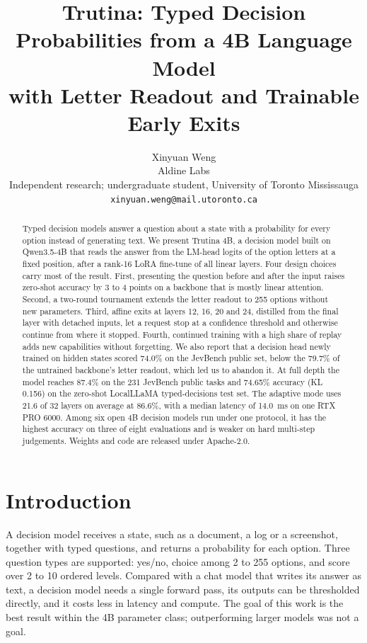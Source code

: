 \documentclass[10pt]{article}
\title{Trutina: Typed Decision Probabilities from a 4B Language Model\\with Letter Readout and Trainable Early Exits}
\author{Xinyuan Weng\\[2pt]\small Aldine Labs\\\small Independent research; undergraduate student, University of Toronto Mississauga\\\small \texttt{xinyuan.weng@mail.utoronto.ca}}
\date{}
\begin{document}
\maketitle

\begin{abstract}
Typed decision models answer a question about a state with a probability for every option instead of generating text.
We present Trutina 4B, a decision model built on Qwen3.5-4B that reads the answer from the LM-head logits of the option letters at a fixed position, after a rank-16 LoRA fine-tune of all linear layers.
Four design choices carry most of the result.
First, presenting the question before and after the input raises zero-shot accuracy by 3 to 4 points on a backbone that is mostly linear attention.
Second, a two-round tournament extends the letter readout to 255 options without new parameters.
Third, affine exits at layers 12, 16, 20 and 24, distilled from the final layer with detached inputs, let a request stop at a confidence threshold and otherwise continue from where it stopped.
Fourth, continued training with a high share of replay adds new capabilities without forgetting.
We also report that a decision head newly trained on hidden states scored 74.0\% on the JevBench public set, below the 79.7\% of the untrained backbone's letter readout, which led us to abandon it.
At full depth the model reaches 87.4\% on the 231 JevBench public tasks and 74.65\% accuracy (KL 0.156) on the zero-shot LocalLLaMA typed-decisions test set.
The adaptive mode uses 21.6 of 32 layers on average at 86.6\%, with a median latency of 14.0~ms on one RTX PRO 6000.
Among six open 4B decision models run under one protocol, it has the highest accuracy on three of eight evaluations and is weaker on hard multi-step judgements.
Weights and code are released under Apache-2.0.
\end{abstract}

\section{Introduction}

A decision model receives a state, such as a document, a log or a screenshot, together with typed questions, and returns a probability for each option.
Three question types are supported: yes/no, choice among 2 to 255 options, and score over 2 to 10 ordered levels.
Compared with a chat model that writes its answer as text, a decision model needs a single forward pass, its outputs can be thresholded directly, and it costs less in latency and compute.
The goal of this work is the best result within the 4B parameter class; outperforming larger models was not a goal.
\end{document}
